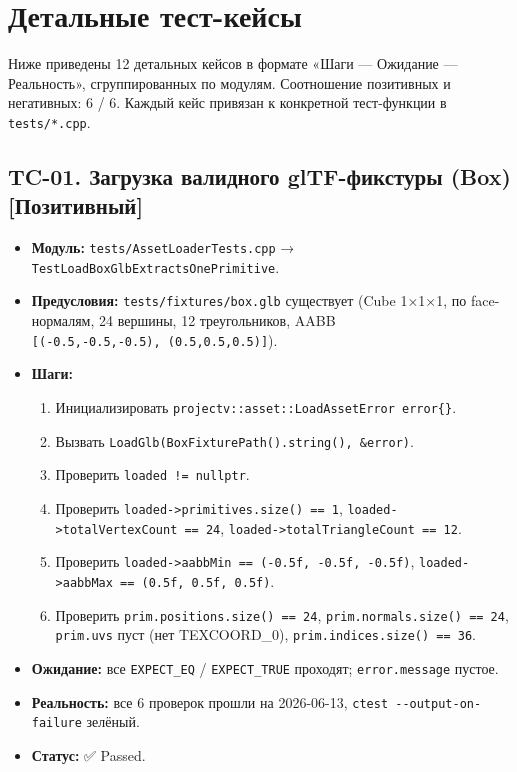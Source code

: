 \documentclass[
  11pt,a4paper,oneside]{article}
\providecommand{\tightlist}{%
  \setlength{\itemsep}{0pt}\setlength{\parskip}{0pt}}
\providecommand{\tightlist}{%
  \setlength{\itemsep}{0pt}\setlength{\parskip}{0pt}}
\begin{document}
\section{Детальные тест-кейсы}\label{ux434ux435ux442ux430ux43bux44cux43dux44bux435-ux442ux435ux441ux442-ux43aux435ux439ux441ux44b}

Ниже приведены 12 детальных кейсов в формате «Шаги --- Ожидание --- Реальность», сгруппированных по модулям. Соотношение позитивных и негативных: 6 / 6. Каждый кейс привязан к конкретной тест-функции в \texttt{tests/*.cpp}.

\subsection{TC-01. Загрузка валидного glTF-фикстуры (Box) {[}Позитивный{]}}\label{tc-01-ux437ux430ux433ux440ux443ux437ux43aux430-ux432ux430ux43bux438ux434ux43dux43eux433ux43e-gltf-ux444ux438ux43aux441ux442ux443ux440ux44b-box-ux43fux43eux437ux438ux442ux438ux432ux43dux44bux439}

\begin{itemize}
\tightlist
\item
  \textbf{Модуль:} \texttt{tests/AssetLoaderTests.cpp} → \texttt{TestLoadBoxGlbExtractsOnePrimitive}.
\item
  \textbf{Предусловия:} \texttt{tests/fixtures/box.glb} существует (Cube 1×1×1, по face-нормалям, 24 вершины, 12 треугольников, AABB \texttt{{[}(-0.5,-0.5,-0.5),\ (0.5,0.5,0.5){]}}).
\item
  \textbf{Шаги:}

  \begin{enumerate}
  \def\labelenumi{\arabic{enumi}.}
  \tightlist
  \item
    Инициализировать \texttt{projectv::asset::LoadAssetError\ error\{\}}.
  \item
    Вызвать \texttt{LoadGlb(BoxFixturePath().string(),\ \&error)}.
  \item
    Проверить \texttt{loaded\ !=\ nullptr}.
  \item
    Проверить \texttt{loaded-\textgreater{}primitives.size()\ ==\ 1}, \texttt{loaded-\textgreater{}totalVertexCount\ ==\ 24}, \texttt{loaded-\textgreater{}totalTriangleCount\ ==\ 12}.
  \item
    Проверить \texttt{loaded-\textgreater{}aabbMin\ ==\ (-0.5f,\ -0.5f,\ -0.5f)}, \texttt{loaded-\textgreater{}aabbMax\ ==\ (0.5f,\ 0.5f,\ 0.5f)}.
  \item
    Проверить \texttt{prim.positions.size()\ ==\ 24}, \texttt{prim.normals.size()\ ==\ 24}, \texttt{prim.uvs} пуст (нет TEXCOORD\_0), \texttt{prim.indices.size()\ ==\ 36}.
  \end{enumerate}
\item
  \textbf{Ожидание:} все \texttt{EXPECT\_EQ} / \texttt{EXPECT\_TRUE} проходят; \texttt{error.message} пустое.
\item
  \textbf{Реальность:} все 6 проверок прошли на 2026-06-13, \texttt{ctest\ -\/-output-on-failure} зелёный.
\item
  \textbf{Статус:} ✅ Passed.
\end{itemize}
\end{document}
